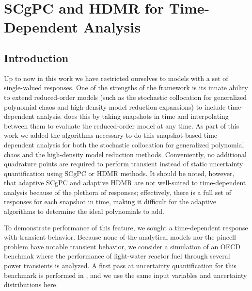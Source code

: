 
\chapter{SCgPC and HDMR for Time-Dependent Analysis} %

\label{ch:timedep} %



\section{Introduction}
Up to now in this work we have restricted ourselves to models with a set of single-valued responses.  One of the strengths
of the \raven{} \cite{OECDraven} framework is its innate ability to extend reduced-order models (such as the stochastic 
collocation for generalized polynomial chaos and high-density model reduction expansions) to
include time-dependent analysis.  \raven{} does this by taking snapshots in time and interpolating between them to evaluate
the reduced-order model at any time.  As part of this work we added the algorithms necessary to do this snapshot-based
time-dependent analysis for both the stochastic collocation for generalized polynomial chaos and the high-density model
reduction methods. Conveniently, no additional quadrature points are required to perform transient instead of static
uncertainty quantification using SCgPC or HDMR methods.  It should be noted, however, that adaptive SCgPC and adaptive
HDMR are not well-suited to time-dependent analysis because of the plethora of responses; effectively, there is a
full set of responses for each snapshot in time, making it difficult for the adaptive algorithms to determine the
ideal polynomials to add.

To demonstrate performance of this feature, we sought a time-dependent response with transient behavior.
Because none of the analytical models nor the \mammoth{} pincell problem have notable transient behavior, we consider
a \bison{} \cite{OECDbison} simulation of an OECD benchmak \cite{OECDbenchmark} where the performance of light-water reactor fuel 
through several power transients is analyzed.  A first pass at uncertainty quantification for this benchmark
is performed in \cite{OECDdakota}, and we use the same input variables and uncertainty distributions here.

